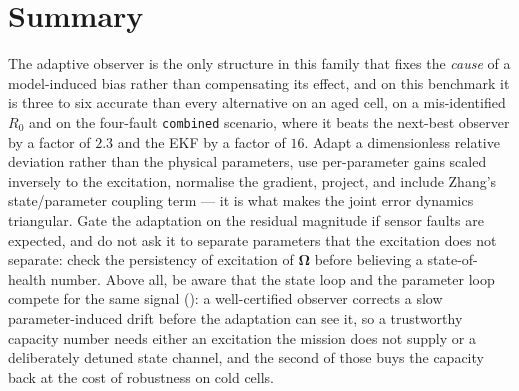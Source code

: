 \section{Summary}
The adaptive observer is the only structure in this family that fixes the \emph{cause} of a
model-induced bias rather than compensating its effect, and on this benchmark it is three to six
accurate than every alternative on an aged cell, on a mis-identified $R_0$ and on the
four-fault \texttt{combined} scenario, where it beats the next-best observer by a factor of
$2.3$ and the EKF by a factor of $16$.  Adapt a dimensionless
relative deviation rather than the physical parameters, use per-parameter gains scaled inversely
to the excitation, normalise the gradient, project, and include Zhang's state/parameter coupling
term --- it is what makes the joint error dynamics triangular.  Gate the adaptation on the
residual magnitude if sensor faults are expected, and do not ask it to separate parameters that
the excitation does not separate: check the persistency of excitation of $\bm{\Omega}$ before
believing a state-of-health number.  Above all, be aware that the state loop and the parameter
loop compete for the same signal (): a well-certified observer corrects a slow
parameter-induced drift before the adaptation can see it, so a trustworthy capacity number needs
either an excitation the mission does not supply or a deliberately detuned state channel, and the
second of those buys the capacity back at the cost of robustness on cold cells.
